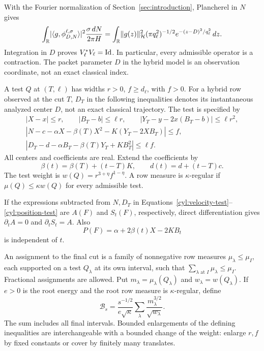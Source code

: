 With the Fourier normalization of Section~\ref{sec:introduction},
Plancherel in $N$ gives
\[
 \int_\mathbb R\lvert \langle g,\phi_{D,N}^{\ell,\sigma}\rangle\rvert^2
                   \frac{\sigma\,dN}{2\pi H}
 =\int_\mathbb R\lVert g(z)\rVert_{\mathcal H}^2
             (\pi q_\ell^2)^{-1/2}e^{-(z-D)^2/q_\ell^2}\,dz.
\]
Integration in $D$ proves $V_\ell^*V_\ell=\mathrm{Id}$.  In particular, every
admissible operator is a contraction.  The packet parameter $D$ in the
hybrid model is an observation coordinate, not an exact classical index.

\begin{definition}\label{cyl:def-test}
A test $Q$ at $(T,\ell)$ has widths $r>0$, $f\ge d_\ell$, with $f>0$.
For a hybrid row observed at the cut $T$, $D_T$ in the following
inequalities denotes its instantaneous analyzed center $D$, not an
exact classical trajectory. The test is specified by
\begin{gather}
 |X-x|\le r,\qquad |B_T-b|\le\ell r,\qquad
 |Y_T-y-2x(B_T-b)|\le\ell r^2,\label{cyl:base-test}\\
 |N-c-\alpha X-\beta(T)X^2-K(Y_T-2XB_T)|\le f,
 \label{cyl:velocity-test}\\
 |D_T-d-\alpha B_T-\beta(T)Y_T+KB_T^2|\le\ell f.
 \label{cyl:position-test}
\end{gather}
All centers and coefficients are real.  Extend the coefficients by
\[
 \beta(t)=\beta(T)+(t-T)K,\qquad d(t)=d+(t-T)c.
\]
The test weight is $w(Q)=r^{3+\eta}f^{1-\eta}$.  A row measure is
$\kappa$-regular if $\mu(Q)\le\kappa w(Q)$ for every admissible test.
\end{definition}

If the expressions subtracted from $N,D_T$ in
Equations~\eqref{cyl:velocity-test}--\eqref{cyl:position-test} are
$A(F)$ and $S_t(F)$, respectively, direct differentiation gives
$\partial_t A=0$ and $\partial_t S_t=A$.  Also
\begin{equation}\label{cyl:derivative}
 P(F)=\alpha+2\beta(t)X-2KB_t
\end{equation}
is independent of $t$.

An assignment to the final cut is a family of nonnegative row measures
$\mu_\lambda\le\mu_I$, each supported on a test $Q_\lambda$ at its own
interval, such that $\sum_{\lambda\text{ at }I}\mu_\lambda\le\mu_I$.
Fractional assignments are allowed.  Put $m_\lambda=\mu_\lambda(Q_\lambda)$
and $w_\lambda=w(Q_\lambda)$.  If $e>0$ is the root energy and the root
row measure is $\kappa$-regular, define
\begin{equation}\label{cyl:functional}
 \mathcal B_s
  =\frac{s^{-1/2}}{e\sqrt\kappa}
           \sum_\lambda\frac{m_\lambda^{3/2}}{\sqrt{w_\lambda}}.
\end{equation}
The sum includes all final intervals.  Bounded enlargements of the defining
inequalities are interchangeable with a bounded change of the weight:
enlarge $r,f$ by fixed constants or cover by finitely many translates.

